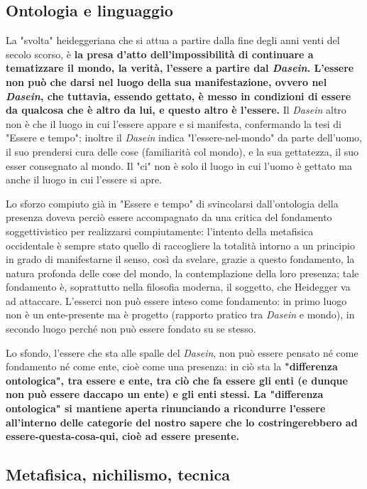 \subsection{Ontologia e linguaggio}

La "svolta" heideggeriana che si attua a partire
dalla fine degli anni venti del secolo scorso, è \textbf{la
presa d'atto dell'impossibilità di continuare a
tematizzare il mondo, la verità, l'essere a partire
dal \textit{Dasein}. L'essere non può che darsi nel luogo della
sua manifestazione, ovvero nel \textit{Dasein}, che tuttavia,
essendo gettato, è messo in condizioni di essere da
qualcosa che è altro da lui, e questo altro è l'essere.}
Il \textit{Dasein} altro non è che il luogo in cui l'essere appare
e si manifesta, confermando la tesi di "Essere e tempo";
inoltre il \textit{Dasein} indica "l'essere-nel-mondo" da parte
dell'uomo, il suo prendersi cura delle cose (familiarità
col mondo), e la sua gettatezza, il suo esser consegnato
al mondo. Il "ci" non è solo il luogo in cui
l'uomo è gettato ma anche il luogo in cui l'essere si apre.

Lo sforzo compiuto già in "Essere e tempo" di svincolarsi
dall'ontologia della presenza doveva perciò essere accompagnato da una critica del fondamento soggettivistico per
realizzarsi compiutamente: l'intento della metafisica
occidentale è sempre stato quello di raccogliere la
totalità intorno a un principio in grado
di manifestarne il senso, così da svelare, grazie a
questo fondamento, la natura profonda delle cose del
mondo, la contemplazione della loro presenza; tale
fondamento è, soprattutto nella filosofia moderna, il
soggetto, che Heidegger va ad attaccare.
L'esserci non può essere inteso come fondamento: in
primo luogo non è un ente-presente ma è progetto
(rapporto pratico tra \textit{Dasein} e mondo), in secondo luogo
perché non può essere fondato su se stesso.

Lo sfondo, l'essere che sta alle spalle del \textit{Dasein},
non può essere pensato né come fondamento né
come ente, cioè come una presenza: in ciò sta
la \textbf{"differenza ontologica", tra essere e ente, tra
ciò che fa essere gli enti (e dunque non può essere
daccapo un ente) e gli enti stessi.
La "differenza ontologica" si mantiene aperta rinunciando
a ricondurre l'essere all'interno delle categorie del
nostro sapere che lo costringerebbero ad
essere-questa-cosa-qui, cioè ad essere presente.}

\subsection{Metafisica, nichilismo, tecnica}

